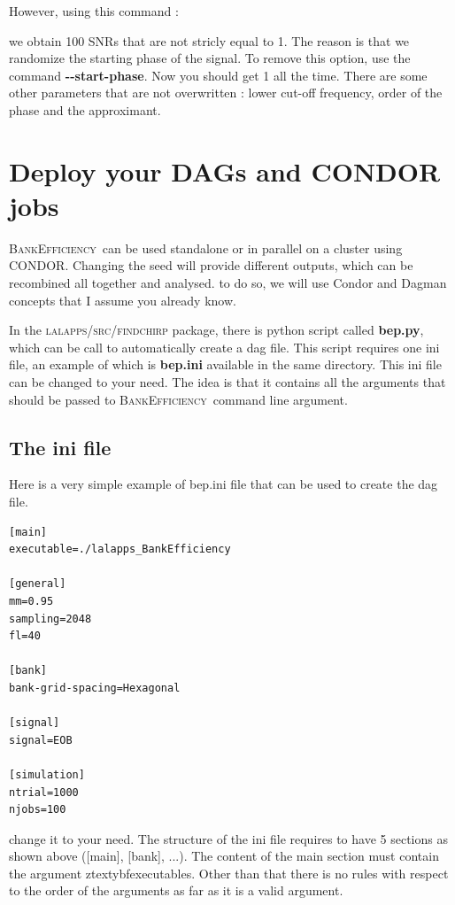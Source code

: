 \documentclass[a4paper,10pt]{article}
\newcommand{\code}[1]{%
\begin{center}
  \fboxsep=10pt
  \fcolorbox{black}{yellow}
  { \parbox[c]{12cm}{ \color{blue}{#1}}}
\end{center}}
\newcommand{\be}{\textsc{BankEfficiency}~}
\begin{document}
However, using this command :
\code{./lalapps\_BankEfficiency --template EOB --signal EOB --xml-output --n 100 --check} 
we obtain 100 SNRs that are not stricly equal to 1. The reason is that we randomize the starting phase of the signal. To remove this option, use the command \textbf{{-}{-}start-phase}. Now you should get 1 all the time. There are some other parameters that are not overwritten : lower cut-off frequency, order of the phase and the approximant.


\section{Deploy your DAGs and CONDOR jobs}\label{dagandini}
\be can be used standalone or in parallel on a cluster using \textsc{CONDOR}. Changing the seed will provide different outputs, which can be recombined all together and analysed. to do so, we will use Condor and Dagman concepts that I assume you already know.

In the \textsc{lalapps/src/findchirp} package, there is python script called \textbf{bep.py}, which can be call to automatically create a dag file. This script requires one ini file, an example of which is \textbf{bep.ini} available in the same directory. This ini file can be changed to your need. The idea is that it contains all the arguments that should be passed to \be command line argument. 


\subsection{The ini file}\label{ini}
Here is a very simple example of bep.ini file that can be used to create the dag file. 

\begin{verbatim}
[main]
executable=./lalapps_BankEfficiency

[general]
mm=0.95
sampling=2048
fl=40

[bank]
bank-grid-spacing=Hexagonal

[signal]
signal=EOB

[simulation]
ntrial=1000
njobs=100
\end{verbatim}

change it to your need. The structure of the ini file  requires to have 5 sections as shown above ([main], [bank], ...). The content of the main section must contain the argument ztextybf{executables}. Other than that there is no rules with respect to the order of the arguments as far as it is a valid  argument. 
\end{document}
